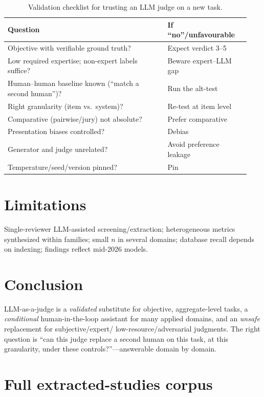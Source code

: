 \documentclass[11pt]{article}
\begin{document}
\begin{table}[t]\centering\small
\caption{Validation checklist for trusting an LLM judge on a new task.}\label{tab:checklist}
\begin{tabular}{@{}p{0.62\linewidth} p{0.32\linewidth}@{}}
\toprule Question & If ``no''/unfavourable \\ \midrule
Objective with verifiable ground truth? & Expect verdict 3--5 \\
Low required expertise; non-expert labels suffice? & Beware expert--LLM gap \\
Human--human baseline known (``match a second human'')? & Run the alt-test \citep{calderon2025alttest} \\
Right granularity (item vs.\ system)? & Re-test at item level \\
Comparative (pairwise/jury) not absolute? & Prefer comparative \citep{verga2024poll} \\
Presentation biases controlled? & Debias \citep{dubois2024lc} \\
Generator and judge unrelated? & Avoid preference leakage \citep{li2025prefleakage} \\
Temperature/seed/version pinned? & Pin \citep{temperature2026} \\ \bottomrule
\end{tabular}\end{table}

\section{Limitations}
Single-reviewer LLM-assisted screening/extraction; heterogeneous metrics synthesized within families; small $n$ in
several domains; database recall depends on indexing; findings reflect mid-2026 models.

\section{Conclusion}
LLM-as-a-judge is a \emph{validated} substitute for objective, aggregate-level tasks, a \emph{conditional}
human-in-the-loop assistant for many applied domains, and an \emph{unsafe} replacement for subjective/expert/
low-resource/adversarial judgments. The right question is ``can this judge replace a second human on this task, at
this granularity, under these controls?''---answerable domain by domain.



\appendix
\section{Full extracted-studies corpus}\label{app:full}
{\footnotesize}
\end{document}
